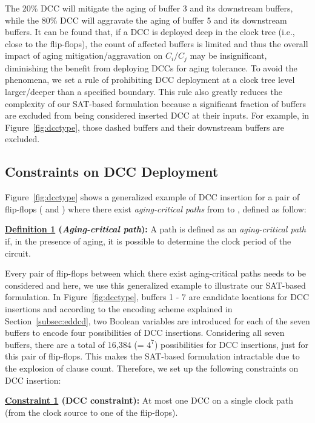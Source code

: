 The 20\% DCC will mitigate the aging of buffer 3 and its downstream buffers, while the 80\% DCC will aggravate the aging of buffer 5 and its downstream buffers. It can be found that, if a DCC is deployed deep in the clock tree (i.e., close to the flip-flops), the count of affected buffers is limited and thus the overall impact of aging mitigation/aggravation on $C_i$/$C_j$ may be insignificant, diminishing the benefit from deploying DCCs for aging tolerance.  To avoid the phenomena, we set a rule of prohibiting DCC deployment at a clock tree level larger/deeper than a specified boundary. This rule also greatly reduces the complexity of our SAT-based formulation because a significant fraction of buffers are excluded from being considered inserted DCC at their inputs. For example, in Figure~\ref{fig:dcctype}, those dashed buffers and their downstream buffers are excluded. 

\subsection{Constraints on DCC Deployment}
\label{subsec:dccccc}

Figure~\ref{fig:dcctype} shows a generalized example of DCC insertion for a pair of flip-flops ( and ) where there exist \textit{aging-critical paths} from  to , defined as follow:

\noindent \textbf{\uline{Definition 1} (\textit{Aging-critical path}):}  A path is defined as an \textit{aging-critical path} if, in the presence of aging, it is possible to determine the clock period of the circuit. 

Every pair of flip-flops between which there exist aging-critical paths needs to be considered and here, we use this generalized example to illustrate our SAT-based formulation. In Figure~\ref{fig:dcctype}, buffers 1 - 7 are candidate locations for DCC insertions and according to the encoding scheme explained in Section~\ref{subsec:eddcd}, two Boolean variables are introduced for each of the seven buffers to encode four possibilities of DCC insertions. Considering all seven buffers, there are a total of 16,384 (= $4^7$) possibilities for DCC insertions, just for this pair of flip-flops. This makes the SAT-based formulation intractable due to the explosion of clause count. Therefore, we set up the following constraints on DCC insertion: 

\noindent \textbf{\uline{Constraint 1} (DCC constraint):} At most one DCC on a single clock path (from the clock source to one of the flip-flops).

